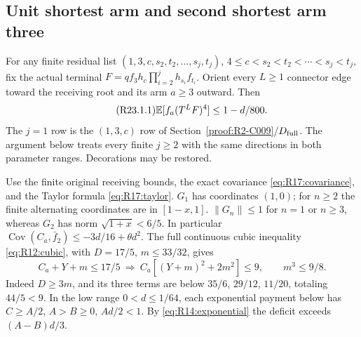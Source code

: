 \subsection{Unit shortest arm and second shortest arm three}\label{proof:R2-C023}
For any finite residual list
$(1,3,c,s_2,t_2,\ldots,s_j,t_j)$,
$4\le c<s_2<t_2<\cdots<s_j<t_j$, fix the actual terminal
$F=qf_3h_c\prod_{i=2}^jh_{s_i}f_{t_i}$.
Orient every $L\ge1$ connector edge toward the receiving root and its
arm $a\ge3$ outward. Then
\begin{equation}\tag{R23.1.1}\label{eq:R23:claim}
\mathbb E[f_a(T^LF)^4]\le1-d/800.
\end{equation}
The $j=1$ row is the $(1,3,c)$ row of Section~\ref{proof:R2-C009}/$D_{\rm full}$.
The argument below treats every finite $j\ge2$ with the same
directions in both parameter ranges. Decorations may be restored.

Use the finite original receiving bounds, the exact covariance
\eqref{eq:R17:covariance}, and the Taylor formula
\eqref{eq:R17:taylor}.
$G_1$ has coordinates $(1,0)$; for $n\ge2$ the finite alternating
coordinates are in $[1-x,1]$. $\|G_n\|\le1$ for $n=1$ or $n\ge3$,
whereas $G_2$ has norm $\sqrt{1+x}<6/5$.
In particular $\operatorname{Cov}(C_a,\bar f_2)
\le-3d/16+\theta d^2$.
The full continuous cubic inequality \eqref{eq:R12:cubic}, with
$D=17/5$, $m\le33/32$, gives
\begin{equation}\tag{R23.2.5}\label{eq:R23:curvature}
C_a+Y+m\le17/5\ \Longrightarrow\
C_a[(Y+m)^2+2m^2]\le9,\qquad m^3\le9/8.
\end{equation}
Indeed $D\ge3m$, and its three terms are below $35/6$, $29/12$,
$11/20$, totaling $44/5<9$.
In the low range $0<d\le1/64$, each exponential payment below has
$C\ge A/2$, $A>B\ge0$, $Ad/2<1$. By
\eqref{eq:R14:exponential} the deficit exceeds $(A-B)d/3$.

